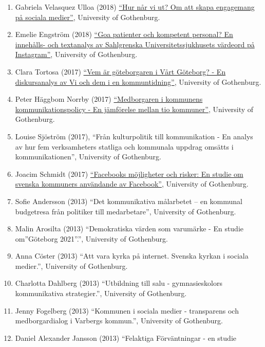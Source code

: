 \documentclass[
]{article}
\providecommand{\tightlist}{%
  \setlength{\itemsep}{0pt}\setlength{\parskip}{0pt}}
\begin{document}
\begin{enumerate}
\def\labelenumi{\arabic{enumi}.}
\tightlist
\item
  Gabriela Velasquez Ulloa (2018)
  \href{https://gupea.ub.gu.se/handle/2077/58024}{``Hur når vi ut? Om
  att skapa engagemang på sociala medier''}, University of Gothenburg.
\item
  Emelie Engström (2018)
  \href{https://gupea.ub.gu.se/handle/2077/58030}{``Goa patienter och
  kompetent personal? En innehålls- och textanalys av Sahlgrenska
  Universitetssjukhusets värdeord på Instagram''}, University of
  Gothenburg.
\item
  Clara Tortosa (2017)
  \href{https://gupea.ub.gu.se/handle/2077/54970}{``Vem är göteborgaren
  i Vårt Göteborg? - En diskursanalys av Vi och dem i en
  kommuntidning''}, University of Gothenburg.
\item
  Peter Häggbom Norrby (2017)
  \href{https://gupea.ub.gu.se/handle/2077/54948}{``Medborgaren i
  kommunens kommunikationspolicy - En jämförelse mellan tio kommuner''},
  University of Gothenburg.
\item
  Louise Sjöström (2017), ``Från kulturpolitik till kommunikation - En
  analys av hur fem verksamheters statliga och kommunala uppdrag omsätts
  i kommunikationen'', University of Gothenburg.
\item
  Joacim Schmidt (2017)
  \href{https://gupea.ub.gu.se/bitstream/2077/52545/1/gupea_2077_52545_1.pdf}{``Facebooks
  möjligheter och risker: En studie om svenska kommuners användande av
  Facebook''}, University of Gothenburg.
\item
  Sofie Andersson (2013) ``Det kommunikativa målarbetet -- en kommunal
  budgetresa från politiker till medarbetare'', University of
  Gothenburg.
\item
  Malin Arosilta (2013) ``Demokratiska värden som varumärke - En studie
  om''Göteborg 2021''.'', University of Gothenburg.
\item
  Anna Cöster (2013) ``Att vara kyrka på internet. Svenska kyrkan i
  sociala medier.'', University of Gothenburg.
\item
  Charlotta Dahlberg (2013) ``Utbildning till salu - gymnasieskolors
  kommunikativa strategier.'', University of Gothenburg.
\item
  Jenny Fogelberg (2013) ``Kommunen i sociala medier - transparens och
  medborgardialog i Varbergs kommun.'', University of Gothenburg.
\item
  Daniel Alexander Jansson (2013) ``Felaktiga Förväntningar - en studie

\end{enumerate}
\end{document}
